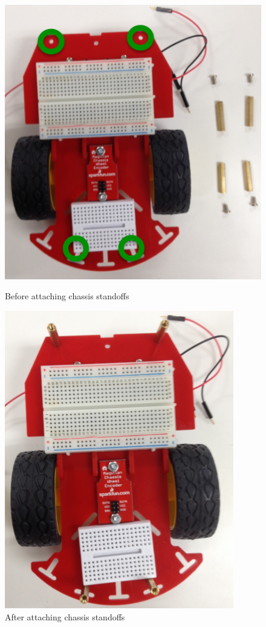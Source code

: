 \begin{figure}[h]
\centering
\includegraphics[width=0.4\columnwidth]{Images/Assembly/7a}
\caption{ Before attaching chassis standoffs}
\vspace{2mm}
\includegraphics[width=0.4\columnwidth]{Images/Assembly/7b}
\caption{ After attaching chassis standoffs}
\label{fig:buzzer}
\end{figure}
